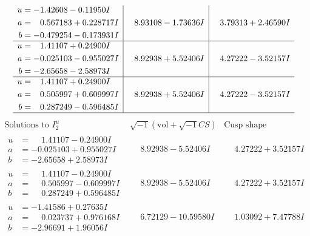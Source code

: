 \documentclass[1p]{elsarticle_modified}
\theoremstyle{definition}
\newcommand{\I}{\sqrt{-1}}
\begin{document}
$$\begin{array}{c|c|c}
\begin{aligned}
u &= -1.42608 - 0.11950 I \\
a &= \phantom{-}0.567183 + 0.228717 I \\
b &= -0.479254 - 0.173931 I\end{aligned}
 & \phantom{-}8.93108 - 1.73636 I & \phantom{-}3.79313 + 2.46590 I \\ \hline\begin{aligned}
u &= \phantom{-}1.41107 + 0.24900 I \\
a &= -0.025103 - 0.955027 I \\
b &= -2.65658 - 2.58973 I\end{aligned}
 & \phantom{-}8.92938 + 5.52406 I & \phantom{-}4.27222 - 3.52157 I \\ \hline\begin{aligned}
u &= \phantom{-}1.41107 + 0.24900 I \\
a &= \phantom{-}0.505997 + 0.609997 I \\
b &= \phantom{-}0.287249 - 0.596485 I\end{aligned}
 & \phantom{-}8.92938 + 5.52406 I & \phantom{-}4.27222 - 3.52157 I\\
 \hline 
 \end{array}$$\newpage$$\begin{array}{c|c|c}  
\text{Solutions to }I^u_{2}& \I (\text{vol} + \sqrt{-1}CS) & \text{Cusp shape}\\
 \hline 
\begin{aligned}
u &= \phantom{-}1.41107 - 0.24900 I \\
a &= -0.025103 + 0.955027 I \\
b &= -2.65658 + 2.58973 I\end{aligned}
 & \phantom{-}8.92938 - 5.52406 I & \phantom{-}4.27222 + 3.52157 I \\ \hline\begin{aligned}
u &= \phantom{-}1.41107 - 0.24900 I \\
a &= \phantom{-}0.505997 - 0.609997 I \\
b &= \phantom{-}0.287249 + 0.596485 I\end{aligned}
 & \phantom{-}8.92938 - 5.52406 I & \phantom{-}4.27222 + 3.52157 I \\ \hline\begin{aligned}
u &= -1.41586 + 0.27635 I \\
a &= \phantom{-}0.023737 + 0.976168 I \\
b &= -2.96691 + 1.96056 I\end{aligned}
 & \phantom{-}6.72129 - 10.59580 I & \phantom{-}1.03092 + 7.47788 I \\ \hline\begin{aligned}

\end{aligned}
\end{array}$$
\end{document}
